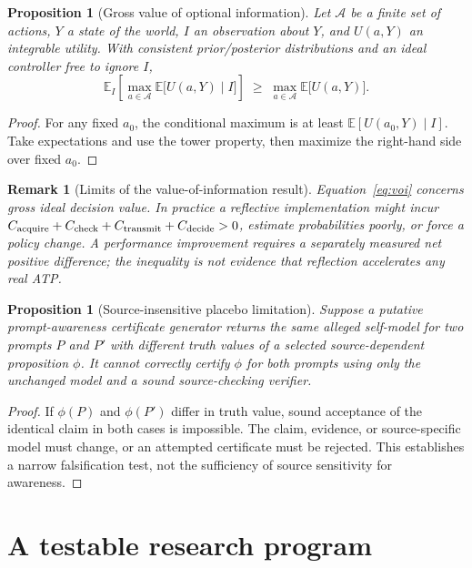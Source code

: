 \documentclass[11pt,letterpaper]{article}
\newtheorem{proposition}[definition]{Proposition}
\newtheorem{remark}[definition]{Remark}
\begin{document}
\begin{proposition}[Gross value of optional information]\label{prop:voi}
Let $\mathcal A$ be a finite set of actions, $Y$ a state of the world, $I$ an observation about $Y$, and $U(a,Y)$ an integrable utility. With consistent prior/posterior distributions and an ideal controller free to ignore $I$,
\begin{equation}\label{eq:voi}
\mathbb E_I\!\left[\max_{a\in\mathcal A}\mathbb E\bigl[U(a,Y)\mid I\bigr]\right]
\;\ge\;\max_{a\in\mathcal A}\mathbb E\bigl[U(a,Y)\bigr].
\end{equation}
\end{proposition}
\begin{proof}
For any fixed $a_0$, the conditional maximum is at least $\mathbb E[U(a_0,Y)\mid I]$. Take expectations and use the tower property, then maximize the right-hand side over fixed $a_0$.
\end{proof}
\begin{remark}[Limits of the value-of-information result]
Equation~\eqref{eq:voi} concerns \emph{gross} ideal decision value. In practice a reflective implementation might incur $C_{\rm acquire}+C_{\rm check}+C_{\rm transmit}+C_{\rm decide}>0$, estimate probabilities poorly, or force a policy change. A performance improvement requires a separately measured \emph{net} positive difference; the inequality is not evidence that reflection accelerates any real ATP.
\end{remark}

\begin{proposition}[Source-insensitive placebo limitation]
Suppose a putative prompt-awareness certificate generator returns the same alleged self-model for two prompts $P$ and $P'$ with different truth values of a selected source-dependent proposition $\phi$. It cannot correctly certify $\phi$ for \emph{both} prompts using only the unchanged model and a sound source-checking verifier.
\end{proposition}
\begin{proof}
If $\phi(P)$ and $\phi(P')$ differ in truth value, sound acceptance of the identical claim in both cases is impossible. The claim, evidence, or source-specific model must change, or an attempted certificate must be rejected. This establishes a narrow falsification test, not the sufficiency of source sensitivity for awareness.
\end{proof}

\section{A testable research program}
\end{document}
